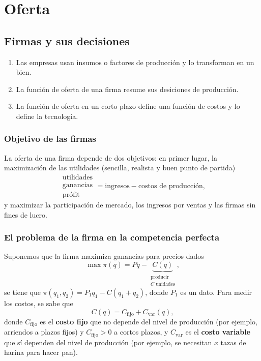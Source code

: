 \documentclass{report}
\begin{document}


\chapter{Oferta}

\thispagestyle{fancy}

\section{Firmas y sus decisiones}

\begin{enumerate}
\item Las empresas usan insumos o factores de producción y lo transforman en un bien.
\item La función de oferta de una firma resume sus desiciones de producción.
\item La función de oferta en un corto plazo define una función de costos y lo define la tecnología.
\end{enumerate}

\subsection{Objetivo de las firmas}

La oferta de una firma depende de dos objetivos: en primer lugar, la maximización de las utilidades (sencilla, realista y buen punto de partida)
\[
\begin{matrix}
\text{utilidades} \\
\text{ganancias} \\
\text{prófit}
\end{matrix}
=\text{ingresos}-\text{costos de producción,}
\]
y maximizar la participación de mercado, los ingresos por ventas y las firmas sin fines de lucro.

\subsection{El problema de la firma en la competencia perfecta}

Suponemos que la firma maximiza ganancias para precios dados
\[
\max\pi\!\left(q\right)=Pq-\underbrace{C\!\left(q\right)}_{\begin{smallmatrix}\text{producir}\\C\text{ unidades}\end{smallmatrix}}\text{,}
\]
se tiene que $\pi\!\left(q_1,q_2\right)=P_1q_1-C\!\left(q_1+q_2\right)$, donde $P_1$ es un dato. Para medir los costos, se sabe que
\[
C\!\left(q\right)=C_\text{fijo}+C_\text{var}\!\left(q\right)\text{,}
\]
donde $C_\text{fijo}$ es el \textbf{costo fijo} que no depende del nivel de producción (por ejemplo, arriendos a plazos fijos) y $C_\text{fijo}>0$ a cortos plazos, y $C_\text{var}$ es el \textbf{costo variable} que sí dependen del nivel de producción (por ejemplo, se necesitan $x$ tazas de harina para hacer pan).
\end{document}
